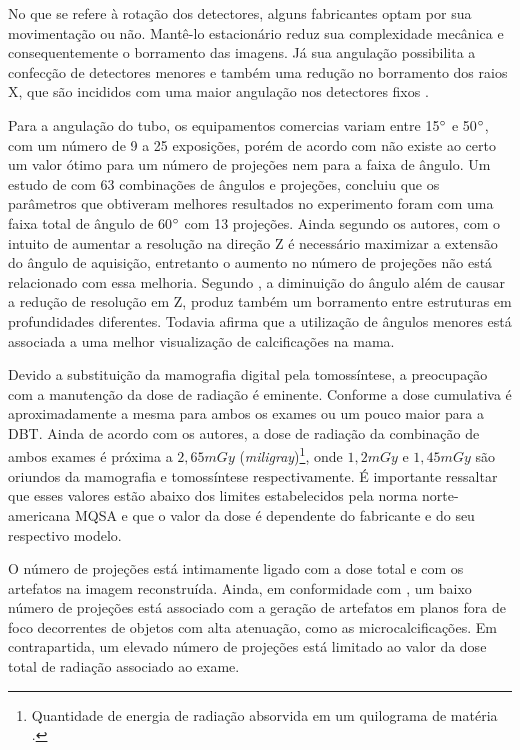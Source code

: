 No que se refere à rotação dos detectores, alguns fabricantes optam por sua movimentação ou não. Mantê-lo estacionário reduz sua complexidade mecânica e consequentemente o borramento das imagens. Já sua angulação possibilita a confecção de detectores menores e também uma redução no borramento dos raios X, que são incididos com uma maior angulação nos detectores fixos \cite{glick2014system}. 

Para a angulação do tubo, os equipamentos comercias variam entre 15$\degree$ e 50$\degree$, com um número de 9 a 25 exposições, porém de acordo com  não existe ao certo um valor ótimo para um número de projeções nem para a faixa de ângulo. Um estudo de  com 63 combinações de ângulos e projeções, concluiu que os parâmetros que obtiveram melhores resultados no experimento foram com uma faixa total de ângulo de 60$\degree$ com 13 projeções. Ainda segundo os autores, com o intuito de aumentar a resolução na direção Z é necessário maximizar a extensão do ângulo de aquisição, entretanto o aumento no número de projeções não está relacionado com essa melhoria. Segundo , a diminuição do ângulo além de causar a redução de resolução em Z, produz também um borramento entre estruturas em profundidades diferentes. Todavia  afirma que a utilização de ângulos menores está associada a uma melhor visualização de calcificações na mama. 

Devido a substituição da mamografia digital pela tomossíntese, a preocupação com a manutenção da dose de radiação é eminente. Conforme  a dose cumulativa é aproximadamente a mesma para ambos os exames ou um pouco maior para a \acs{DBT}. Ainda de acordo com os autores, a dose de radiação da combinação de ambos exames é próxima a $2,65 mGy$ (\textit{miligray})\footnote{Quantidade de energia de radiação absorvida em um quilograma de matéria \cite{Hooley20189}.}, onde $1,2 mGy$ e $1,45 mGy$ são oriundos da mamografia e tomossíntese respectivamente. É importante ressaltar que esses valores estão abaixo dos limites estabelecidos pela norma norte-americana \ac{MQSA} e que o valor da dose é dependente do fabricante e do seu respectivo modelo. 

O número de projeções está intimamente ligado com a dose total e com os artefatos na imagem reconstruída. Ainda, em conformidade com , um baixo número de projeções está associado com a geração de artefatos em planos fora de foco decorrentes de objetos com alta atenuação, como as microcalcificações. Em contrapartida, um elevado número de projeções está limitado ao valor da dose total de radiação associado ao exame. 

